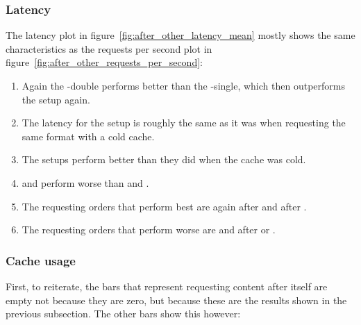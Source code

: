 \documentclass[twoside,openright]{uva-bachelor-thesis}
\begin{document}
\subsubsection{Latency}
The latency plot in figure~\ref{fig:after_other_latency_mean} mostly shows the
same characteristics as the requests per second plot in
figure~\ref{fig:after_other_requests_per_second}:
\begin{enumerate}
    \item
        Again the \lt-double performs better than the \lt-single, which then
        outperforms the \cdn setup again.

    \item
        The latency for the \cdn setup is roughly the same as it was when
        requesting the same format with a cold cache.

    \item
        The \lt setups perform better than they did when the cache was cold.

    \item
        \hds and \hls perform worse than \iss and \dash.

    \item
        The requesting orders that perform best are again \iss after \dash and
        \dash after \iss.

    \item
        The requesting orders that perform worse are \hls and \hds after \dash
        or \iss.

\end{enumerate}


\FloatBarrier



\subsubsection{Cache usage}
First, to reiterate, the bars that represent requesting content after itself
are empty not because they are zero, but because these are the results shown in
the previous subsection. The other bars show this however:
\end{document}
